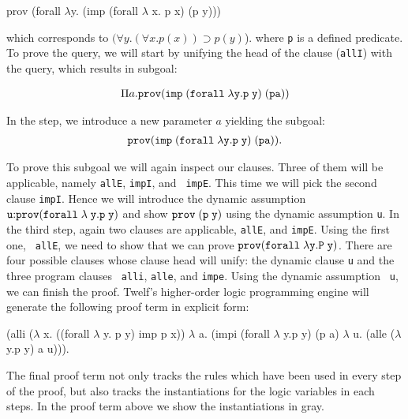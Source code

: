 \documentclass{llncs}
\newcommand{\mygray}[1]{{\color{gray}#1}}
\newcommand{\pfLF}{{\tt{prov}}}
\newcommand{\impLF}{\tt{imp}\;}
\newcommand{\forallLF}{\tt{forall}\;}
\newcommand{\impl}{\supset}
\begin{document}
\begin{code}
prov (forall $\lambda$y. (imp (forall $\lambda$ x. p x) (p y)))  
\end{code}

which corresponds to $(\forall y. (\forall x.p(x)) \impl p(y)$).  
where {\tt p} is a defined predicate. To prove the query, we will
start by unifying the head of the clause ({\tt allI}) with the
query, which results in subgoal:  

\[
\begin{array}{c}
\Pi a. \pfLF ( \impLF (\forallLF \lambda y. p\; y)\; (p a))
\end{array}
\]

In the {} step, we introduce a new parameter $a$
yielding the subgoal:
\[
\begin{array}{c}
\pfLF ( \impLF (\forallLF \lambda y. p\; y)\; (p a)).
\end{array}
\]

To prove this subgoal we will again inspect our clauses. Three of them
will be applicable, namely {\tt allE}, {\tt impI}, and {\tt
  impE}. This time we will pick the second clause {\tt impI}. Hence we
will introduce the dynamic assumption ${\tt{u}} {:} \pfLF (\forallLF
\lambda \;y. p\; y)$ and show $\pfLF\; {\tt (p\; y)}$ using the dynamic
assumption {\tt{u}}. In the third step, again two clauses are
applicable,  {\tt allE}, and {\tt impE}. Using the first one, {\tt
  allE}, we need to show that we can prove $\pfLF (\forallLF \lambda
y. P\; y)$. There are four possible clauses whose clause head will
unify: the dynamic clause {\tt u} and the three program clauses {\tt
  alli}, {\tt alle}, and {\tt impe}. Using the dynamic assumption {\tt
  u}, we can finish the proof. Twelf's
higher-order logic programming engine will generate the following
proof term in explicit form:  

\begin{code}
(alli {\mygray{($\lambda\!\!$ x. ((forall $\lambda\!\!$ y. p y) imp p x))}}
   $\lambda\!\!$ a. (impi {\mygray{(forall $\lambda\!\!$ y.p y) (p a)}}
           $\lambda\!\!$ u. (alle {\mygray{($\lambda\!\!$ y.p y)}} a u))).
\end{code}

The final proof term not only tracks the rules which have been used in
every step of the proof, but also tracks the instantiations for the logic
variables in each steps. In the proof term above we show the
instantiations in gray.
\end{document}
